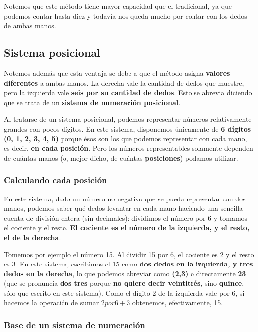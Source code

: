 \documentclass[spanish,A4,]{article}
\begin{document}
Notemos que este método tiene mayor capacidad que el tradicional, ya que
podemos contar hasta diez y todavía nos queda mucho por contar con los
dedos de ambas manos.

\subsection{Sistema posicional}\label{sistema-posicional}

Notemos además que esta ventaja se debe a que el método asigna
\textbf{valores diferentes} a ambas manos. La derecha vale la cantidad
de dedos que muestre, pero la izquierda vale \textbf{seis por su
cantidad de dedos}. Esto se abrevia diciendo que se trata de un
\textbf{sistema de numeración posicional}.

Al tratarse de un sistema posicional, podemos representar números
relativamente grandes con pocos dígitos. En este sistema, disponemos
únicamente de \textbf{6 dígitos (0, 1, 2, 3, 4, 5)} porque ésos son los
que podemos representar con cada mano, es decir, \textbf{en cada
posición}. Pero los números representables solamente dependen de cuántas
manos (o, mejor dicho, de cuántas \textbf{posiciones}) podamos utilizar.

\subsubsection{Calculando cada
posición}\label{calculando-cada-posiciuxf3n}

En este sistema, dado un número no negativo que se pueda representar con
dos manos, podemos saber qué dedos levantar en cada mano haciendo una
sencilla cuenta de división entera (sin decimales): dividimos el número
por 6 y tomamos el cociente y el resto. \textbf{El cociente es el número
de la izquierda, y el resto, el de la derecha}.

Tomemos por ejemplo el número 15. Al dividir 15 por 6, el cociente es 2
y el resto es 3. En este sistema, escribimos el 15 como \textbf{dos
dedos en la izquierda, y tres dedos en la derecha}, lo que podemos
abreviar como \textbf{(2,3)} o directamente \textbf{23} (que se
pronuncia \textbf{dos tres} porque \textbf{no quiere decir veintitrés},
sino \textbf{quince}, sólo que escrito en este sistema). Como el dígito
2 de la izquierda vale por 6, si hacemos la operación de sumar
\textbf{$2  por  6 + 3$} obtenemos, efectivamente, 15.

\subsubsection{Base de un sistema de
numeración}\label{base-de-un-sistema-de-numeraciuxf3n}
\end{document}
